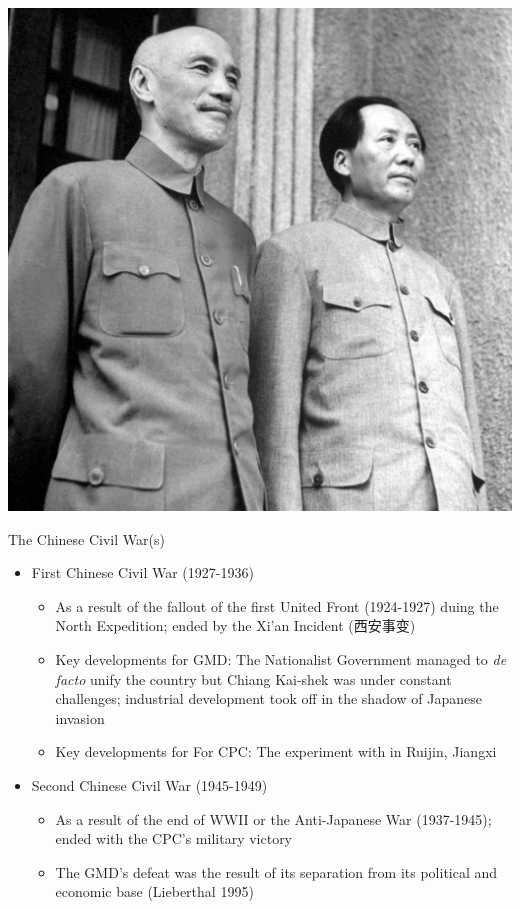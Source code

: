 \documentclass[
  10pt,
  ignorenonframetext,
]{beamer}
\begin{document}
\begin{frame}
\vspace{0.3cm}

\begin{center}\includegraphics[width=0.6\linewidth]{Figs/chongqing_new} \end{center}
\end{frame}

\begin{frame}{The Chinese Civil War(s)}
\protect\hypertarget{the-chinese-civil-wars}{}
\begin{itemize}
  \item First Chinese Civil War (1927-1936)
  \begin{itemize}
    \item As a result of the fallout of the first United Front (1924-1927) duing the North Expedition; ended by the Xi'an Incident (西安事变)
    \item Key developments for GMD: The Nationalist Government managed to \textit{de facto} unify the country but Chiang Kai-shek was under constant challenges; industrial development took off in the shadow of Japanese invasion 
    \item Key developments for For CPC: The experiment with in Ruijin, Jiangxi
  \end{itemize}
  \vspace{0.3cm}
  \item Second Chinese Civil War (1945-1949)
  \begin{itemize}
    \item As a result of the end of WWII or the Anti-Japanese War (1937-1945); ended with the CPC's military victory
    \item The GMD's defeat was the result of its separation from its political and economic base (Lieberthal 1995)
  \end{itemize}
\end{itemize}
\end{frame}
\end{document}
